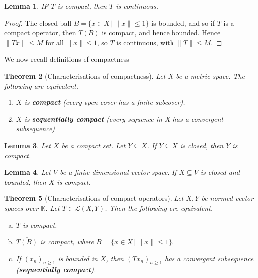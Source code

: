 \documentclass[10pt, oneside, reqno]{amsbook}
\theoremstyle{plain}%
\newtheorem{thm}{Theorem}[section]
\newtheorem{lem}[thm]{Lemma}
\theoremstyle{definition}
\theoremstyle{remark}
\newcommand{\given}{ \, | \,}
\newcommand{\K}{\mathbb{K}}
\begin{document}
\begin{lem}
    IF $T$ is compact, then $T$ is continuous.
\end{lem}
\begin{proof}
    The closed ball $B  = \{ x \in X \given \| x \| \leq 1 \}$ is bounded, and so if $T$ is a compact operator, then $\overline{T(B)}$ is compact, and hence bounded.  Hence $\| Tx \| \leq M$ for all $\| x \| \leq 1$, so $T$ is continuous, with $\| T \| \leq M$.  
\end{proof}

We now recall definitions of compactness
\begin{thm}[Characterisations of compactness]
    Let $X$ be a metric space. The following are equivalent.  
    \begin{enumerate}[(1)]
        \item $X$ is \textbf{compact} (every open cover has a finite subcover).
        \item $X$ is \textbf{sequentially compact} (every sequence in $X$ has a convergent subsequence)
    \end{enumerate}
\end{thm}

\begin{lem}
    Let $X$ be a compact set.  Let $Y \subseteq X$. If $Y \subseteq X$ is closed, then $Y$ is compact.
\end{lem}

\begin{lem}
    Let $V$ be a finite dimensional vector space.  If $X \subseteq V$ is closed and bounded, then $X$ is compact.
\end{lem}

\begin{thm}[Characterisations of compact operators]
    \label{thm:charcompact}
    Let $X, Y$ be normed vector spaces over $\K$.  Let $T \in \mathcal L(X,Y)$.  Then the following are equivalent.
    \begin{enumerate}[(a)]
        \item $T$ is compact.
        \item $\overline{T(B)}$ is compact, where $B = \{ x \in X \given \| x \| \leq 1 \}$.  
        \item If $(x_n)_{n \geq 1}$ is bounded in $X$, then $(Tx_n)_{n \geq 1}$ has a convergent subsequence (\textbf{sequentially compact}).
    \end{enumerate}
\end{thm}
\end{document}
